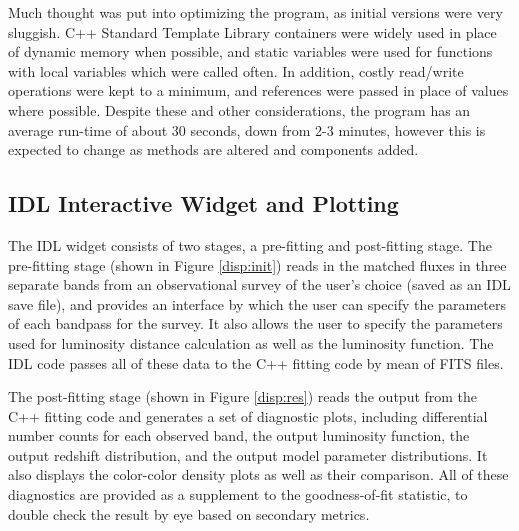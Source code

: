 \documentclass[twocolumn,letterpaper,10pt]{article}
\begin{document}
Much thought was put into optimizing the program, as initial versions were very sluggish. C++ Standard Template Library containers were widely used in place of dynamic memory when possible, and static variables were used for functions with local variables which were called often. In addition, costly read/write operations were kept to a minimum, and references were passed in place of values where possible. Despite these and other considerations, the program has an average run-time of about 30 seconds, down from 2-3 minutes, however this is expected to change as methods are altered and components added.

\subsection{IDL Interactive Widget and Plotting}

The IDL widget consists of two stages, a pre-fitting and post-fitting stage. The pre-fitting stage (shown in Figure \ref{disp:init}) reads in the matched fluxes in three separate bands from an observational survey of the user's choice (saved as an IDL save file), and provides an interface by which the user can specify the parameters of each bandpass for the survey. It also allows the user to specify the parameters used for luminosity distance calculation as well as the luminosity function. The IDL code passes all of these data to the C++ fitting code by mean of FITS files.

The post-fitting stage (shown in Figure \ref{disp:res}) reads the output from the C++ fitting code and generates a set of diagnostic plots, including differential number counts for each observed band, the output luminosity function, the output redshift distribution, and the output model parameter distributions. It also displays the color-color density plots as well as their comparison. All of these diagnostics are provided as a supplement to the goodness-of-fit statistic, to double check the result by eye based on secondary metrics.
\end{document}

